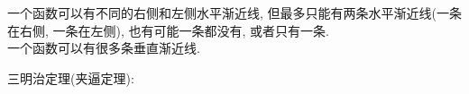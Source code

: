 一个函数可以有不同的右侧和左侧水平渐近线, 但最多只能有两条水平渐近线(一条在右侧, 一条在左侧), 也有可能一条都没有, 或者只有一条.\\

一个函数可以有很多条垂直渐近线.\\\vspace{4ex}

三明治定理(夹逼定理):
{\par\centering
{}
\par}

